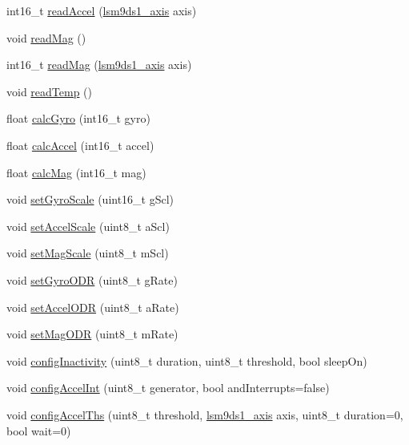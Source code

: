 \begin{DoxyCompactItemize}
int16\+\_\+t \hyperlink{class_l_s_m9_d_s1_acbe3bfc0b8db7fe3f77893d22c394594}{read\+Accel} (\hyperlink{_spark_fun_l_s_m9_d_s1_8h_adcbc07abda18c22c46d0a1129bb61164}{lsm9ds1\+\_\+axis} axis)
\item 
void \hyperlink{class_l_s_m9_d_s1_ae127cf75aa5f3c5421e49363795dcd38}{read\+Mag} ()
\item 
int16\+\_\+t \hyperlink{class_l_s_m9_d_s1_a615fd3ab32a9af833ef9899663100330}{read\+Mag} (\hyperlink{_spark_fun_l_s_m9_d_s1_8h_adcbc07abda18c22c46d0a1129bb61164}{lsm9ds1\+\_\+axis} axis)
\item 
void \hyperlink{class_l_s_m9_d_s1_aca21a51dc79a1287b97ed9c326e2080b}{read\+Temp} ()
\item 
float \hyperlink{class_l_s_m9_d_s1_a76707323565bc4170ea8e27a932c95e4}{calc\+Gyro} (int16\+\_\+t gyro)
\item 
float \hyperlink{class_l_s_m9_d_s1_a54e2a7888b67b47cf0dd986c5b91a3c5}{calc\+Accel} (int16\+\_\+t accel)
\item 
float \hyperlink{class_l_s_m9_d_s1_a7d0b0740497b1a10cd3e46a282a143ec}{calc\+Mag} (int16\+\_\+t mag)
\item 
void \hyperlink{class_l_s_m9_d_s1_a115d304ebcdc8c701f3e5a5d397250aa}{set\+Gyro\+Scale} (uint16\+\_\+t g\+Scl)
\item 
void \hyperlink{class_l_s_m9_d_s1_a8656d2de1ff9cc4cb76214e4561d02c4}{set\+Accel\+Scale} (uint8\+\_\+t a\+Scl)
\item 
void \hyperlink{class_l_s_m9_d_s1_ad7604159a07b0d088cdfb6ba4a0093b0}{set\+Mag\+Scale} (uint8\+\_\+t m\+Scl)
\item 
void \hyperlink{class_l_s_m9_d_s1_ab8fc33c8da4fc5c379e880ff57d331fa}{set\+Gyro\+O\+DR} (uint8\+\_\+t g\+Rate)
\item 
void \hyperlink{class_l_s_m9_d_s1_a76d72839cdecc3f1c4ee6fff578182c5}{set\+Accel\+O\+DR} (uint8\+\_\+t a\+Rate)
\item 
void \hyperlink{class_l_s_m9_d_s1_a8bc672fba680edc468a643fd58046b41}{set\+Mag\+O\+DR} (uint8\+\_\+t m\+Rate)
\item 
void \hyperlink{class_l_s_m9_d_s1_a1e318c5e7c1d500c3ab2602c46265354}{config\+Inactivity} (uint8\+\_\+t duration, uint8\+\_\+t threshold, bool sleep\+On)
\item 
void \hyperlink{class_l_s_m9_d_s1_a1e8ebc6c1e3876d8936197dc93f76717}{config\+Accel\+Int} (uint8\+\_\+t generator, bool and\+Interrupts=false)
\item 
void \hyperlink{class_l_s_m9_d_s1_acebcf64ab4e6ea7ed7a23c09ef16afe9}{config\+Accel\+Ths} (uint8\+\_\+t threshold, \hyperlink{_spark_fun_l_s_m9_d_s1_8h_adcbc07abda18c22c46d0a1129bb61164}{lsm9ds1\+\_\+axis} axis, uint8\+\_\+t duration=0, bool wait=0)

\end{DoxyCompactItemize}
